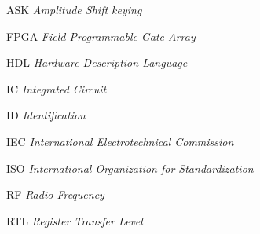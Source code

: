 \begin{siglas}
\item[ASK] \textit{Amplitude Shift keying}
\item[FPGA] \textit{Field Programmable Gate Array}
 \item[HDL] \textit{Hardware Description Language}
  \item[IC] \textit{Integrated Circuit}
  \item[ID] \textit{Identification}
  \item[IEC] \textit{International Electrotechnical Commission}
  \item[ISO] \textit{International Organization for Standardization}
  \item[RF]\textit{ Radio Frequency}
  \item[RTL] \textit{Register Transfer Level}
  
\end{siglas}
